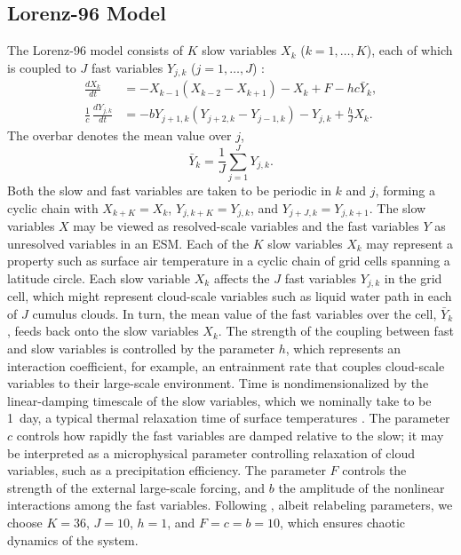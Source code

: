 \documentclass[draft]{agujournal}
\begin{document}
\subsection{Lorenz-96 Model}

The Lorenz-96 model consists of $K$ slow variables $X_k$ ($k=1, \dots, K$), each of which is coupled to $J$ fast variables $Y_{j,k}$ ($j=1,\dots, J$) \citep{Lorenz96a}:
\begin{align}
\frac{dX_k}{dt}     &= - X_{k-1}(X_{k-2} - X_{k+1}) - X_k + F - hc \bar{Y}_k, \label{e:l96_slow}\\
\frac{1}{c} \, \frac{dY_{j,k}}{dt} &= -b Y_{j+1,k}(Y_{j+2,k} - Y_{j-1, k}) - Y_{j,k} + \frac{h}{J} X_k. \label{e:l96_fast}
\end{align}
The overbar denotes the mean value over $j$,
\begin{equation}
\bar{Y}_k = \frac{1}{J} \sum_{j=1}^J Y_{j,k}.
\end{equation}
Both the slow and fast variables are taken to be periodic in $k$ and $j$, forming a cyclic chain with $X_{k+K} = X_k$, $Y_{j, k+K}=Y_{j, k}$, and $Y_{j+J,k} = Y_{j,k+1}$.  The slow variables $X$ may be viewed as resolved-scale variables and the fast variables $Y$ as unresolved variables in an ESM. Each of the $K$ slow variables $X_k$ may represent a property such as surface air temperature in a cyclic chain of grid cells spanning a latitude circle. Each slow variable $X_k$ affects the $J$ fast variables $Y_{j,k}$ in the grid cell, which might represent cloud-scale variables such as liquid water path in each of $J$ cumulus clouds. In turn, the mean value of the fast variables over the cell, $\bar{Y}_k$, feeds back onto the slow variables $X_k$. The strength of the coupling between fast and slow variables is controlled by the parameter $h$, which represents an interaction coefficient, for example, an entrainment rate that couples cloud-scale variables to their large-scale environment. Time is nondimensionalized by the linear-damping timescale of the slow variables, which we nominally take to be 1~day, a typical thermal relaxation time of surface temperatures \citep{Swanson97b}. The parameter $c$ controls how rapidly the fast variables are damped relative to the slow; it may be interpreted as a microphysical parameter controlling relaxation of cloud variables, such as a precipitation efficiency.  The parameter $F$ controls the strength of the external large-scale forcing, and $b$ the amplitude of the nonlinear interactions among the fast variables. Following \citet{Lorenz96a}, albeit relabeling parameters, we choose $K=36$, $J=10$, $h=1$, and $F=c=b=10$, which ensures chaotic dynamics of the system. 
\end{document}
